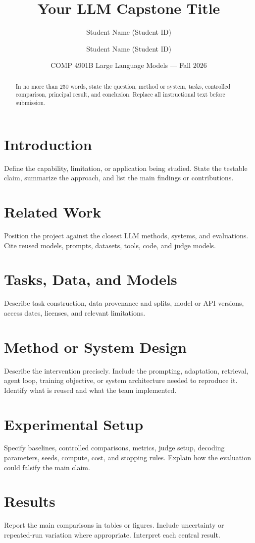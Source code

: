 \documentclass[10pt]{article}
\title{\vspace{-1.5em}\textbf{Your LLM Capstone Title}}
\author{Student Name (Student ID) \and Student Name (Student ID)}
\date{COMP 4901B Large Language Models --- Fall 2026}
\begin{document}
\maketitle

\begin{abstract}
In no more than 250 words, state the question, method or system, tasks, controlled comparison, principal result, and conclusion. Replace all instructional text before submission.
\end{abstract}

\section{Introduction}
Define the capability, limitation, or application being studied. State the testable claim, summarize the approach, and list the main findings or contributions.

\section{Related Work}
Position the project against the closest LLM methods, systems, and evaluations. Cite reused models, prompts, datasets, tools, code, and judge models.

\section{Tasks, Data, and Models}
Describe task construction, data provenance and splits, model or API versions, access dates, licenses, and relevant limitations.

\section{Method or System Design}
Describe the intervention precisely. Include the prompting, adaptation, retrieval, agent loop, training objective, or system architecture needed to reproduce it. Identify what is reused and what the team implemented.

\section{Experimental Setup}
Specify baselines, controlled comparisons, metrics, judge setup, decoding parameters, seeds, compute, cost, and stopping rules. Explain how the evaluation could falsify the main claim.

\section{Results}
Report the main comparisons in tables or figures. Include uncertainty or repeated-run variation where appropriate. Interpret each central result.
\end{document}

